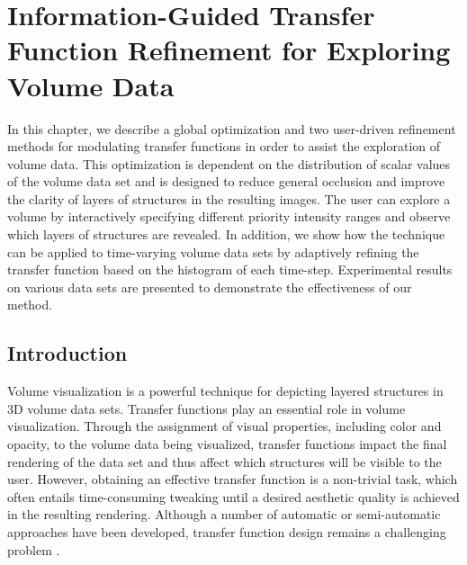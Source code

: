 \chapter{Information-Guided Transfer Function Refinement for Exploring Volume Data \label{transfer_function_refinement}}
In this chapter, we describe a global optimization and two user-driven refinement methods for modulating transfer functions in order to assist the exploration of volume data.
This optimization is dependent on the distribution of scalar values of the volume data set and is designed to reduce general occlusion and improve the clarity of layers of structures in the resulting images.
The user can explore a volume by interactively specifying different priority intensity ranges and observe which layers of structures are revealed. In addition, we show how the technique can be applied to time-varying volume data sets by adaptively refining the transfer function based on the histogram of each time-step. 
Experimental results on various data sets are presented to demonstrate the effectiveness of our method.

\section{Introduction}
Volume visualization is a powerful technique for depicting layered structures in 3D volume data sets.
Transfer functions play an essential role in volume visualization.
Through the assignment of visual properties, including color and opacity, to the volume data being visualized,
transfer functions impact the final rendering of the data set and thus affect which structures will be 
visible to the user.
However, obtaining an effective transfer function is a non-trivial task, which often entails time-consuming tweaking until a desired aesthetic quality is achieved in the resulting rendering.
Although a number of automatic or semi-automatic approaches have been developed, transfer function design remains a challenging problem \cite{pfister_transfer_2001} \cite{arens_survey_2010}.


